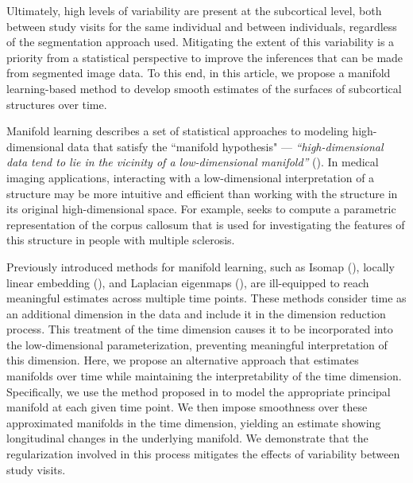 \documentclass[11pt,reqno]{article}
\theoremstyle{definition}
\begin{document}
Ultimately, high levels of variability are present at the subcortical level, both between study visits for the same individual and between individuals, regardless of the segmentation approach used. Mitigating the extent of this variability is a priority from a statistical perspective to improve the inferences that can be made from segmented image data. To this end, in this article, we propose a manifold learning-based method to develop smooth estimates of the surfaces of subcortical structures over time.

Manifold learning describes a set of statistical approaches to modeling high-dimensional data that satisfy the ``manifold hypothesis" --- \textit{``high-dimensional data tend to lie in the vicinity of a low-dimensional manifold''} (\cite{fefferman2016testing}). In medical imaging applications, interacting with a low-dimensional interpretation of a structure may be more intuitive and efficient than working with the structure in its original high-dimensional space. For example, \cite{yueParameterizationWhiteMatter2016} seeks to compute a parametric representation of the corpus callosum that is used for investigating the features of this structure in people with multiple sclerosis.

Previously introduced methods for manifold learning, such as Isomap (\cite{tenenbaumGlobalGeometricFramework2000}), locally linear embedding (\cite{roweisNonlinearDimensionalityReduction2000}), and Laplacian eigenmaps (\cite{belkin2003laplacian}), are ill-equipped to reach meaningful estimates across multiple time points. These methods consider time as an additional dimension in the data and include it in the dimension reduction process. This treatment of the time dimension causes it to be incorporated into the low-dimensional parameterization, preventing meaningful interpretation of this dimension. Here, we propose an alternative approach that estimates manifolds over time while maintaining the interpretability of the time dimension. Specifically, we use the method proposed in \cite{mengPrincipalManifoldEstimation2021} to model the appropriate principal manifold at each given time point. We then impose smoothness over these approximated manifolds in the time dimension, yielding an estimate showing longitudinal changes in the underlying manifold. We demonstrate that the regularization involved in this process mitigates the effects of variability between study visits.
\end{document}
